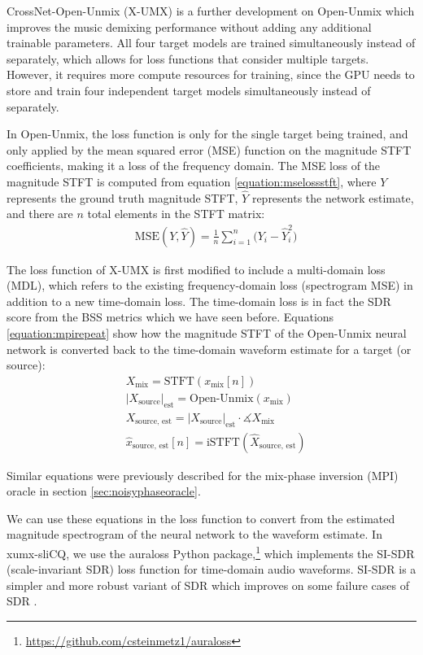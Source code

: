 \documentclass[report.tex]{subfiles}
\begin{document}
CrossNet-Open-Unmix (X-UMX) \parencite{xumx} is a further development on Open-Unmix which improves the music demixing performance without adding any additional trainable parameters. All four target models are trained simultaneously instead of separately, which allows for loss functions that consider multiple targets. However, it requires more compute resources for training, since the GPU needs to store and train four independent target models simultaneously instead of separately.

In Open-Unmix, the loss function is only for the single target being trained, and only applied by the mean squared error (MSE) function on the magnitude STFT coefficients, making it a loss of the frequency domain. The MSE loss of the magnitude STFT is computed from equation \eqref{equation:mselossstft}, where $Y$ represents the ground truth magnitude STFT, $\hat{Y}$ represents the network estimate, and there are $n$ total elements in the STFT matrix:
\begin{align}\tag{31}\label{equation:mselossstft}
	\nonumber & \text{MSE}(Y, \hat{Y}) = \frac{1}{n} \sum_{i = 1}^{n}{(Y_{i}-\hat{Y}_{i}^{2}})
\end{align}

The loss function of X-UMX is first modified to include a multi-domain loss (MDL), which refers to the existing frequency-domain loss (spectrogram MSE) in addition to a new time-domain loss. The time-domain loss is in fact the SDR score from the BSS metrics which we have seen before. Equations \eqref{equation:mpirepeat} show how the magnitude STFT of the Open-Unmix neural network is converted back to the time-domain waveform estimate for a target (or source):
\begin{align}\tag{32}\label{equation:mpirepeat}
	\nonumber & X_{\text{mix}} = \text{STFT}(x_{\text{mix}}[n])\\
	\nonumber & {|X_{\text{source}}|}_{\text{est}} = \text{Open-Unmix}(x_{\text{mix}})\\
	\nonumber & X_{\text{source, est}} = {|X_{\text{source}}|}_{\text{est}} \cdot \measuredangle{X_{\text{mix}}}\\
	\nonumber & \hat{x}_{\text{source, est}}[n] = \text{iSTFT}(\hat{X}_{\text{source, est}})
\end{align}

Similar equations were previously described for the mix-phase inversion (MPI) oracle in section \ref{sec:noisyphaseoracle}.

We can use these equations in the loss function to convert from the estimated magnitude spectrogram of the neural network to the waveform estimate. In xumx-sliCQ, we use the auraloss Python package,\footnote{\url{https://github.com/csteinmetz1/auraloss}} which implements the SI-SDR (scale-invariant SDR) \parencite{roux2018sdr} loss function for time-domain audio waveforms. SI-SDR is a simpler and more robust variant of SDR which improves on some failure cases of SDR \parencite{roux2018sdr}.
\end{document}
